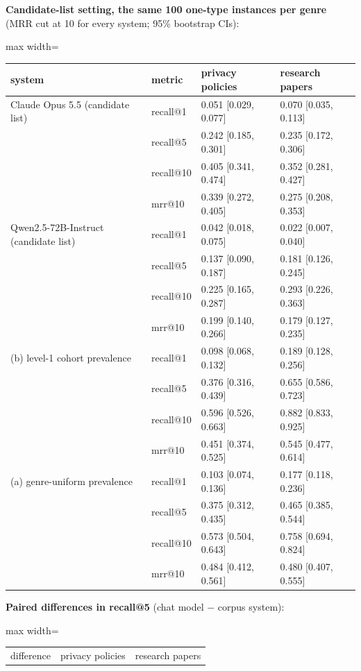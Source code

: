 \documentclass[11pt,a4paper]{article}
\newcommand{\panel}[1]{\par\medskip\noindent #1\par\smallskip}
\begin{document}
\begin{table}[!htbp]
\centering\small
\panel{\textbf{Candidate-list setting, the same 100 one-type instances per genre} (MRR cut at 10 for every system; 95\% bootstrap CIs):}
\begin{adjustbox}{max width=\linewidth}
\begin{tabular}{llll}
\toprule
system & metric & privacy policies & research papers \\
\midrule
Claude Opus 5.5 (candidate list) & recall@1 & 0.051 [0.029, 0.077] & 0.070 [0.035, 0.113] \\
 & recall@5 & 0.242 [0.185, 0.301] & 0.235 [0.172, 0.306] \\
 & recall@10 & 0.405 [0.341, 0.474] & 0.352 [0.281, 0.427] \\
 & mrr@10 & 0.339 [0.272, 0.405] & 0.275 [0.208, 0.353] \\
Qwen2.5-72B-Instruct (candidate list) & recall@1 & 0.042 [0.018, 0.075] & 0.022 [0.007, 0.040] \\
 & recall@5 & 0.137 [0.090, 0.187] & 0.181 [0.126, 0.245] \\
 & recall@10 & 0.225 [0.165, 0.287] & 0.293 [0.226, 0.363] \\
 & mrr@10 & 0.199 [0.140, 0.266] & 0.179 [0.127, 0.235] \\
(b) level-1 cohort prevalence & recall@1 & 0.098 [0.068, 0.132] & 0.189 [0.128, 0.256] \\
 & recall@5 & 0.376 [0.316, 0.439] & 0.655 [0.586, 0.723] \\
 & recall@10 & 0.596 [0.526, 0.663] & 0.882 [0.833, 0.925] \\
 & mrr@10 & 0.451 [0.374, 0.525] & 0.545 [0.477, 0.614] \\
(a) genre-uniform prevalence & recall@1 & 0.103 [0.074, 0.136] & 0.177 [0.118, 0.236] \\
 & recall@5 & 0.375 [0.312, 0.435] & 0.465 [0.385, 0.544] \\
 & recall@10 & 0.573 [0.504, 0.643] & 0.758 [0.694, 0.824] \\
 & mrr@10 & 0.484 [0.412, 0.561] & 0.480 [0.407, 0.555] \\
\bottomrule
\end{tabular}
\end{adjustbox}
\panel{\textbf{Paired differences in recall@5} (chat model $-$ corpus system):}
\begin{adjustbox}{max width=\linewidth}
\begin{tabular}{lll}
\toprule
difference & privacy policies & research papers \\

\end{tabular}
\end{adjustbox}
\end{table}
\end{document}
